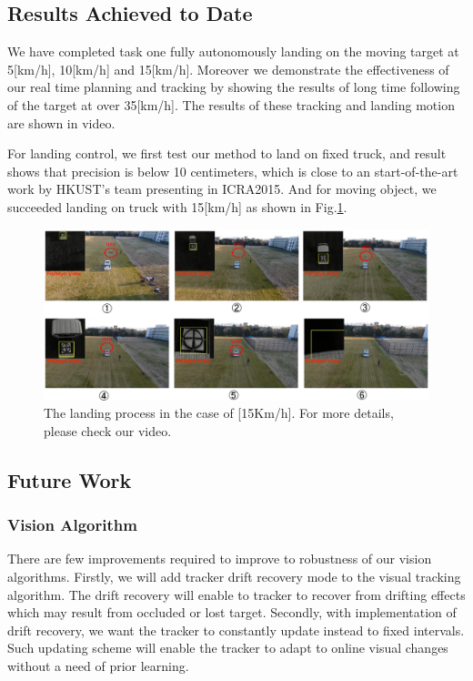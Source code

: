 \documentclass{standalone}
\begin{document}
\subsection{Results Achieved to Date}

We have completed task one fully autonomously landing on the moving
target at 5[km/h], 10[km/h] and 15[km/h]. Moreover we demonstrate the effectiveness of our real time planning and tracking by showing the results of long time
following of the target at over 35[km/h]. The results of these tracking and landing motion are shown in video.

For landing control, we first test our method to land on fixed truck, and result shows that precision is below 10 centimeters, which is close to an start-of-the-art work by HKUST's team presenting in ICRA2015. And for moving object, we succeeded landing on truck with 15[km/h] as shown in Fig.\ref{figure:landing}.

\begin{figure}[h]
    \begin{center}
      \includegraphics[clip, bb= 0 0 720 315, width=1.0\columnwidth]{sections/task1/images/task1_landing.eps}
    \end{center}
    \caption{The landing process in the case of [15Km/h]. For more details, please check our video.}
    \label{figure:landing}
\end{figure}


\subsection{Future Work}
\subsubsection{Vision Algorithm}
There are few improvements required to improve to robustness of our
vision algorithms. Firstly, we will add tracker drift recovery mode to
the visual tracking algorithm. The drift recovery will enable to
tracker to recover from drifting effects which may result from
occluded or lost target. Secondly, with implementation of drift
recovery, we want the tracker to constantly update instead to fixed
intervals. Such updating scheme will enable the tracker to adapt to
online visual changes without a need of prior learning.
\end{document}
